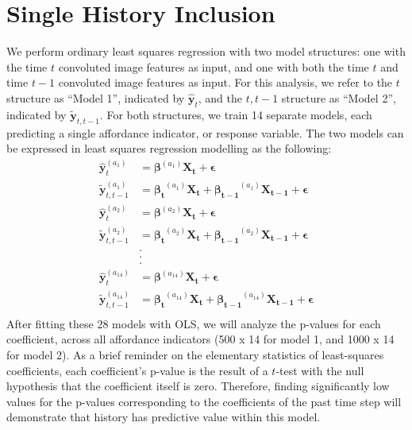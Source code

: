 \documentclass[master]{subfiles}
\begin{document}
\section{Single History Inclusion}\label{sec:single_history}
We perform ordinary least squares regression with two model structures: one with the time $t$ convoluted image features as input, and one with both the time $t$ and time $t - 1$ convoluted image features as input.  For this analysis, we refer to the $t$ structure as ``Model 1'', indicated by $\hat{\mathbf{y}}_t$,  and the $t, t-1$ structure as ``Model 2'', indicated by $\tilde{\mathbf{y}}_{t, t-1}$.  For both structures, we train 14 separate models, each predicting a single affordance indicator, or response variable.  The two models can be expressed in least squares regression modelling as the following:
\begin{align*}
\hat{\mathbf{y}}_t^{(a_1)} &= \bm{\beta}^{(a_1)}\mathbf{X_t} + \bm{\epsilon}\\
\tilde{\mathbf{y}}_{t, t-1}^{(a_1)} &= \bm{\beta_t}^{(a_1)}\mathbf{X_t} + \bm{\beta_{t-1}}^{(a_1)}\mathbf{X_{t-1}} + \bm{\epsilon}\\
\hat{\mathbf{y}}_t^{(a_2)} &= \bm{\beta}^{(a_2)}\mathbf{X_t} + \bm{\epsilon}\\
\tilde{\mathbf{y}}_{t, t-1}^{(a_2)} &= \bm{\beta_t}^{(a_2)}\mathbf{X_t} + \bm{\beta_{t-1}}^{(a_2)}\mathbf{X_{t-1}} + \bm{\epsilon}\\
&.\\&.\\&.\\
\hat{\mathbf{y}}_t^{(a_{14})} &= \bm{\beta}^{(a_{14})}\mathbf{X_t} + \bm{\epsilon}\\
\tilde{\mathbf{y}}_{t, t-1}^{(a_{14})} &= \bm{\beta_t}^{(a_{14})}\mathbf{X_t} + \bm{\beta_{t-1}}^{(a_{14})}\mathbf{X_{t-1}} + \bm{\epsilon}\\
\end{align*}
After fitting these 28 models with OLS, we will analyze the p-values for each coefficient, across all affordance indicators (500 x 14 for model 1, and 1000 x 14 for model 2).  As a brief reminder on the elementary statistics of least-squares coefficients, each coefficient's p-value is the result of a $t$-test with the null hypothesis that the coefficient itself is zero.  Therefore, finding significantly low values for the p-values corresponding to the coefficients of the past time step will demonstrate that history has predictive value within this model.
\end{document}
